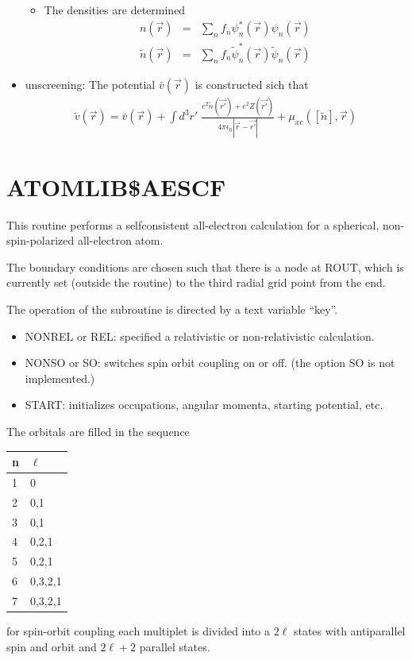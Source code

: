 \documentclass[11pt,a4paper]{report}
\begin{document}
\begin{itemize}
\begin{itemize}
\item The densities are determined
\begin{eqnarray*}
n(\vec{r})&=&\sum_n f_n\psi^*_n(\vec{r})\psi_n(\vec{r})
\\
\tilde{n}(\vec{r})&=&\sum_n f_n\tilde{\psi}^*_n(\vec{r})\tilde{\psi}_n(\vec{r})
\end{eqnarray*}
\end{itemize}
\item unscreening: The potential $\bar{v}(\vec{r})$ is constructed sich that
\begin{eqnarray*}
\tilde{v}(\vec{r})=\bar{v}(\vec{r})+\int d^3r'\;
\frac{e^2\tilde{n}(\vec{r'})+e^2Z(\vec{r'})}{4\pi\epsilon_0|\vec{r}-\vec{r'}|}
+\mu_{xc}([\tilde{n}],\vec{r})
\end{eqnarray*}
\end{itemize}




\section{ATOMLIB\$AESCF}
\label{sec:atomlibaescf}
This routine performs a selfconsistent all-electron calculation for a
spherical, non-spin-polarized all-electron atom.

The boundary conditions are chosen such that there is a node at ROUT,
which is currently set (outside the routine) to the third radial grid
point from the end.

The operation of the subroutine is directed by a text variable ``key''.
\begin{itemize}
\item NONREL or REL: specified a relativistic or non-relativistic
  calculation.
\item NONSO or SO: switches spin orbit coupling on or off. (the option
  SO is not implemented.)
\item START: initializes occupations, angular momenta, starting
  potential, etc.
\end{itemize}

The orbitals are filled in the sequence
\begin{center}
\begin{tabular}{|l|l|}
\hline
n & $\ell$\\
\hline
1 & 0 \\
2 & 0,1\\
3 & 0,1 \\
4 & 0,2,1 \\
5 & 0,2,1 \\
6 & 0,3,2,1 \\
7 & 0,3,2,1\\
\hline
\end{tabular}
\end{center}
for spin-orbit coupling each multiplet is divided into a $2\ell$
states with antiparallel spin and orbit and $2\ell+2$ parallel states.
\end{document}

